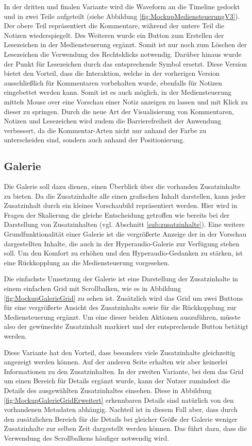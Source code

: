 In der dritten und finalen Variante wird die Waveform an die Timeline gedockt und in zwei Teile aufgeteilt (siehe Abbildung \ref{fig:MockupMediensteuerungV3}). Der obere Teil repräsentiert die Kommentare, während der untere Teil die Notizen wiederspiegelt. Des Weiteren wurde ein Button zum Erstellen der Lesezeichen in der Mediensteuerung ergänzt. Somit ist nur noch zum Löschen der Lesezeichen die Verwendung des Rechtsklicks notwendig. Darüber hinaus wurde der Punkt für Lesezeichen durch das entsprechende Symbol ersetzt. Diese Version bietet den Vorteil, dass die Interaktion, welche in der vorherigen Version ausschließlich für Kommentaren vorbehalten wurde, ebenfalls für Notizen eingebettet werden kann. Somit ist es auch möglich, in der Mediensteuerung mittels Mouse over eine Vorschau einer Notiz anzeigen zu lassen und mit Klick zu dieser zu springen. Durch die neue Art der Visualisierung von Kommentaren, Notizen und Lesezeichen wird zudem die Barrierefreiheit der Anwendung verbessert, da die Kommentar-Arten nicht nur anhand der Farbe zu unterscheiden sind, sondern auch anhand der Positionierung.

\subsection{Galerie}
Die Galerie soll dazu dienen, einen Überblick über die vorhanden Zusatzinhalte zu bieten. Da die Zusatzinhalte alle einen grafischen Inhalt darstellen, kann jeder Zusatzinhalt durch ein kleines Vorschaubild repräsentiert werden. Hier wird in Fragen der Skalierung die gleiche Entscheidung getroffen wie bereits bei der Darstellung von Zusatzinhalten (vgl. Abschnitt \ref{sub:zusatzinhalte}).
Eine weitere Grundfunktionalität einer Galerie ist die vergrößerte Anzeige der in der Vorschau dargestellten Inhalte, die auch in der Hyperaudio-Galerie zur Verfügung stehen soll. Um den Komfort zu erhöhen und den Hyperaudio-Gedanken zu stärken, ist eine Rückkopplung an die Mediensteuerung vorgesehen.

Die einfachste Umsetzung der Galerie ist eine Darstellung der Zusatzinhalte in einem einfachen Grid  mit Scrollbalken, wie es in Abbildung \ref{fig:MockupGalerieGrid} zu sehen ist. Zusätzlich wird das Grid um zwei Buttons für eine vergrößerte Ansicht des Zusatzinhalts sowie für die Rückkopplung zur Mediensteuerung ergänzt. Um eine dieser beiden Aktionen auszuführen, müsste also der gewünschte Zusatzinhalt markiert und der entsprechende Button betätigt werden.

Diese Variante hat den Vorteil, dass besonders viele Zusatzinhalte gleichzeitig angezeigt werden können. Auf der anderen Seite erhalten wir aber keinerlei Informationen zu den Zusatzinhalten. In der zweiten Variante, bei dem das Grid um einen Bereich für Details ergänzt wurde, kann der Nutzer zumindest die Details des ausgewählten Zusatzinhaltes einsehen. Diese in Abbildung \ref{fig:MockupGalerieGridErweitert} erkennbaren Details sind natürlich von den vorhandenen Metadaten abhängig. Nachteil ist in diesem Fall aber, dass durch den zusätzlichen Bereich für die Details bei gleicher Größe der Galerie weniger Zusatzinhalte zur selben Zeit dargestellt werden können. Das führt dazu, dass die Verwendung des Scrollbalkens häufiger notwendig wird.

